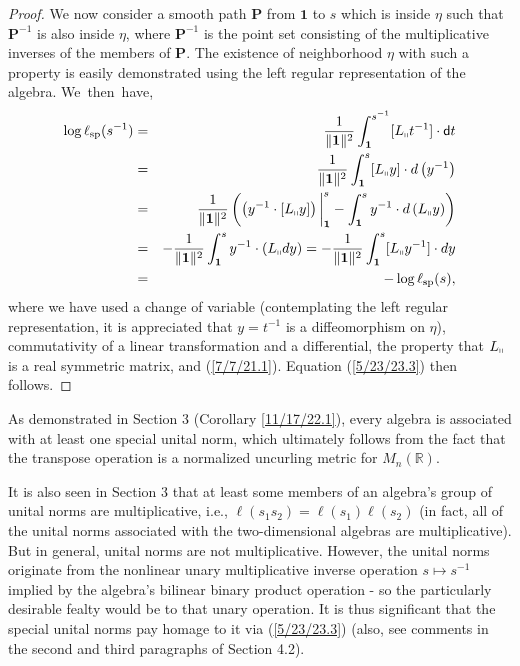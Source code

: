 \documentclass{amsart}
\numberwithin{equation}{section}
\theoremstyle{definition}
\numberwithin{theorem}{section}
\begin{document}
\begin{proof}
We 
now consider a smooth path $\mathbf{P}$ from $\mathbf{1}$ to $s$ which is inside $\eta$  such that $\mathbf{P}^{-1}$ is also inside $\eta$,  where $\mathbf{P}^{-1}$ is the point set consisting of the multiplicative inverses of the members of $\mathbf{P}$.  The  existence of neighborhood $\eta$ with such a property  is \enlargethispage{1.2cm} easily demonstrated using the left regular representation of the algebra.
\mbox{We then have,} \begin{eqnarray}  \log \ell_{\rm sp}(s^{-1})   &=&   \frac{1}{\|{\bf 1}\|^2} \int_{\bf 1}^{s^{-1}} [L_{\shortparallel}t^{-1}] \cdot {\sf d}t \nonumber \\ &=&  \frac{1}{\|{\bf 1}\|^2} \int_{\bf 1}^s [L_{\shortparallel}y]\cdot d\left(y^{-1}\right) \nonumber \\ &=&  \frac{1}{\|{\bf 1}\|^2}\left(\left(y^{-1}\cdot [L_{\shortparallel}y]\right)\bigg|_{\bf 1}^s - \int_{\bf 1}^s y^{-1}\cdot d\left(L_{\shortparallel}y\right)\right)   \nonumber \\ &=& -\frac{1}{\|{\bf 1}\|^2} \int_{\bf 1}^s y^{-1}\cdot (L_{\shortparallel}dy) = -\frac{1}{\|{\bf 1}\|^2} \int_{\bf 1}^s [L_{\shortparallel}y^{-1}] \cdot dy  \nonumber \\ &=& -\log \ell_{\rm sp}(s),\label{4/2/23.5} \end{eqnarray} where we have used a change of variable (contemplating the left regular representation, it is appreciated that $y=t^{-1}$ is a diffeomorphism on $\eta$), commutativity of a linear transformation and a differential, the property that $L_{\shortparallel}$ is a real symmetric matrix, and  (\ref{7/7/21.1}).  Equation (\ref{5/23/23.3}) then follows.
\end{proof}



As demonstrated in Section 3 (Corollary \ref{11/17/22.1}), every algebra is associated with at least one special unital norm, which ultimately follows from the fact that the transpose operation is a normalized uncurling metric for $M_n(\mathbb{R})$.

It is also seen in Section 3 that at least some members of an algebra's group of unital norms are multiplicative, i.e., $\ell(s_1s_2) = \ell(s_1)\ell(s_2)$ (in fact, all of the unital norms associated with the two-dimensional algebras are multiplicative).   But in general, unital norms are not multiplicative.  However, the unital norms originate from the nonlinear unary multiplicative inverse operation $s\mapsto s^{-1}$ implied by the algebra's bilinear binary product operation - so the particularly desirable fealty would be to that unary operation.  It is thus significant that the special unital norms pay homage to it via (\ref{5/23/23.3}) (also, see comments in the second and third paragraphs of Section 4.2).
\end{document}
